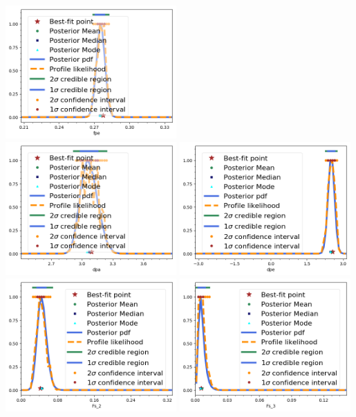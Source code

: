\begin{center}
\includegraphics[width=0.49\textwidth]{figs/fpe.png}\\
\includegraphics[width=0.49\textwidth]{figs/dpa.png}
\includegraphics[width=0.49\textwidth]{figs/dpe.png}\\
\includegraphics[width=0.49\textwidth]{figs/Fs_2.png}
\includegraphics[width=0.49\textwidth]{figs/Fs_3.png}\\

\end{center}
